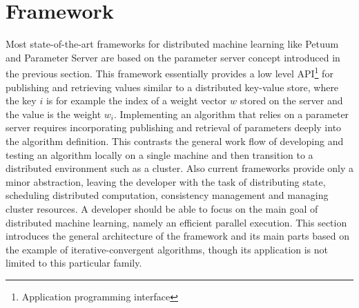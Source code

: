 
\chapter{Framework}
\label{c:state_centric}
Most state-of-the-art frameworks for distributed machine learning like Petuum \cite{Xing2015} and Parameter Server \cite{Li2014} are based on the parameter server concept introduced in the previous section.
This framework essentially provides a low level API\footnote{Application programming interface} for publishing and retrieving values similar to a distributed key-value store, where the key $i$ is for example the index of a weight vector $w$ stored on the server and the value is the weight $w_i$.
Implementing an algorithm that relies on a parameter server requires incorporating publishing and retrieval of parameters deeply into the algorithm definition.
This contrasts the general work flow of developing and testing an algorithm locally on a single machine and then transition to a distributed environment such as a cluster.
Also current frameworks provide only a minor abstraction, leaving the developer with the task of distributing state, scheduling distributed computation, consistency management and managing cluster resources.
A developer should be able to focus on the main goal of distributed machine learning, namely an efficient parallel execution.
This section introduces the general architecture of the framework and its main parts based on the example of iterative-convergent algorithms, though its application is not limited to this particular family.


